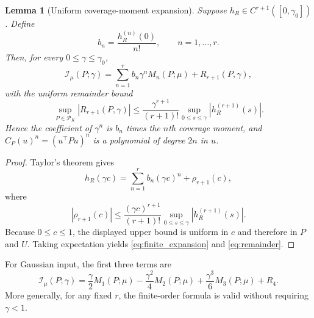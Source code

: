 \documentclass[lettersize,onecolumn]{IEEEtran}
\newtheorem{lemma}{Lemma}
\theoremstyle{remark}
\theoremstyle{definition}
\newcommand{\I}{\mathcal I}
\newcommand{\Pset}{\mathcal P_K}
\begin{document}
\begin{lemma}[Uniform coverage-moment expansion]\label{lem:expansion}
Suppose $h_R\in C^{r+1}([0,\gamma_0])$. Define
\begin{equation}
b_n=\frac{h_R^{(n)}(0)}{n!},\qquad n=1,\ldots,r.
\end{equation}
Then, for every $0\le\gamma\le\gamma_0$,
\begin{equation}
\I_\mu(P;\gamma)
=\sum_{n=1}^{r}b_n\gamma^nM_n(P;\mu)+R_{r+1}(P,\gamma),
\label{eq:finite_expansion}
\end{equation}
with the uniform remainder bound
\begin{equation}
\sup_{P\in\Pset}|R_{r+1}(P,\gamma)|
\le
\frac{\gamma^{r+1}}{(r+1)!}
\sup_{0\le s\le\gamma}|h_R^{(r+1)}(s)|.
\label{eq:remainder}
\end{equation}
Hence the coefficient of $\gamma^n$ is $b_n$ times the $n$th coverage moment, and $C_P(u)^n=(u^{\top}Pu)^n$ is a polynomial of degree $2n$ in $u$.
\end{lemma}
\begin{proof}
Taylor's theorem gives
\begin{equation*}
h_R(\gamma c)=\sum_{n=1}^{r}b_n(\gamma c)^n+\rho_{r+1}(c),
\end{equation*}
where
\begin{equation*}
|\rho_{r+1}(c)|\le\frac{(\gamma c)^{r+1}}{(r+1)!}\sup_{0\le s\le\gamma}|h_R^{(r+1)}(s)|.
\end{equation*}
Because $0\le c\le1$, the displayed upper bound is uniform in $c$ and therefore in $P$ and $U$. Taking expectation yields \eqref{eq:finite_expansion} and \eqref{eq:remainder}.
\end{proof}

For Gaussian input, the first three terms are
\begin{equation}
\I_\mu(P;\gamma)
=\frac{\gamma}{2}M_1(P;\mu)-\frac{\gamma^2}{4}M_2(P;\mu)+\frac{\gamma^3}{6}M_3(P;\mu)+R_4.
\label{eq:gaussian_series}
\end{equation}
More generally, for any fixed $r$, the finite-order formula is valid without requiring $\gamma<1$.


\end{document}
